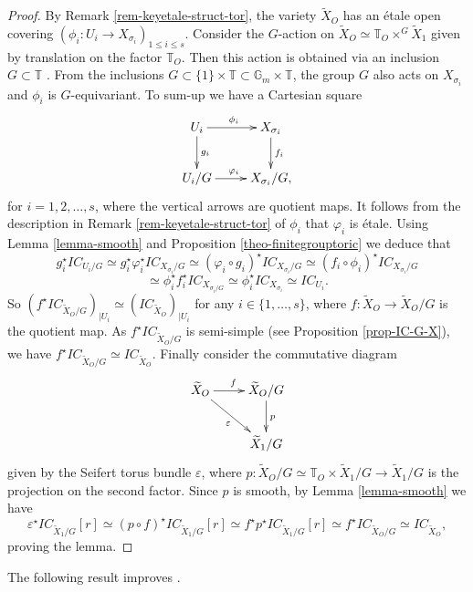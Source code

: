 \documentclass[11pt, reqno]{amsart}
\theoremstyle{plain}
\theoremstyle{definition}
\theoremstyle{remark}
\begin{document}
\begin{proof}
By Remark \ref{rem-keyetale-struct-tor}, the variety $\widetilde{X}_{O}$ has an \'etale open covering $(\phi_{i}:U_{i}\rightarrow X_{\sigma_{i}})_{1\leq i\leq s}$.
Consider the $G$-action on $\widetilde{X}_{O}\simeq \mathbb{T}_{O}\times^{G} \widetilde{X}_{1}$ given by translation on the factor $\mathbb{T}_{O}$. Then this action 
is obtained via an inclusion $G\subset \mathbb{T}$ \cite[Lemma 4.2]{AL21}. From the inclusions $G\subset \{1\}\times\mathbb{T}\subset \mathbb{G}_{m}\times \mathbb{T}$, the group $G$ also acts on $X_{\sigma_{i}}$ and $\phi_{i}$ is $G$-equivariant. To sum-up we have a Cartesian square
$$\xymatrix{U_{i}\ar[r]^{\phi_{i}} \ar[d] ^{g_{i}} & X_{\sigma_{i}}\ar[d]^{f_{i}}\\ U_{i}/G \ar[r]^{\varphi_{i}} & X_{\sigma_{i}}/G,}$$ 
for $i = 1,2, \ldots, s$, where the vertical arrows are quotient maps. It follows from the description in Remark \ref{rem-keyetale-struct-tor} of $\phi_{i}$ that 
$\varphi_{i}$ is \'etale.
Using Lemma \ref{lemma-smooth}  and Proposition \ref{theo-finitegrouptoric} we deduce that
$$g_{i}^{\star} IC_{U_{i}/G}\simeq g_{i}^{\star} \varphi_{i}^{\star} IC_{X_{\sigma_{i}}/G}\simeq (\varphi_{i}\circ g_{i})^{\star}IC_{X_{\sigma_{i}}/G}\simeq (f_{i}\circ\phi_{i})^{\star} IC_{X_{\sigma_{i}}/G}$$ $$\simeq \phi_{i}^{\star} f_{i}^{\star} IC_{X_{\sigma_{i}/G}}\simeq \phi_{i}^{\star} IC_{X_{\sigma_{i}}}\simeq IC_{U_{i}}.$$
So $(f^{\star}IC_{\widetilde{X}_{O}/G})_{|U_{i}}\simeq (IC_{\widetilde{X}_{O}})_{|U_{i}}$ for any $i\in \{1,\ldots, s\}$,
where $f: \widetilde{X}_{O}\rightarrow \widetilde{X}_{O}/G$ is the quotient map. As $f^{\star}IC_{\widetilde{X}_{O}/G}$
is semi-simple (see Proposition \ref{prop-IC-G-X}), we have $f^{\star}IC_{\widetilde{X}_{O}/G}
\simeq IC_{\widetilde{X}_{O}}$. Finally consider the commutative diagram
$$
\xymatrix{
\widetilde{X}_{O} \ar[r]^{f} \ar[dr]_{\varepsilon} & \widetilde{X}_{O}/G \ar[d]^{p} \\
 & \widetilde{X}_{1}/G
}
$$
given by the Seifert torus bundle $\varepsilon$,
where $p: \widetilde{X}_{O}/G\simeq \mathbb{T}_{O}\times \widetilde{X}_{1}/G\rightarrow \widetilde{X}_{1}/G$ is the projection
on the second factor. Since $p$ is smooth, by Lemma \ref{lemma-smooth} we have
$$\varepsilon^{\star}IC_{\widetilde{X}_{1}/G}[r]\simeq (p\circ f)^{\star}  IC_{\widetilde{X}_{1}/G}[r]\simeq f^{\star} p^{\star} IC_{\widetilde{X}_{1}/G}[r]\simeq f^{\star} IC_{\widetilde{X}_{O}/G}\simeq  IC_{\widetilde{X}_{O}},$$
proving the lemma.
\end{proof}
The following result  improves \cite[Theorem 1.1]{AL21}.
\end{document}

